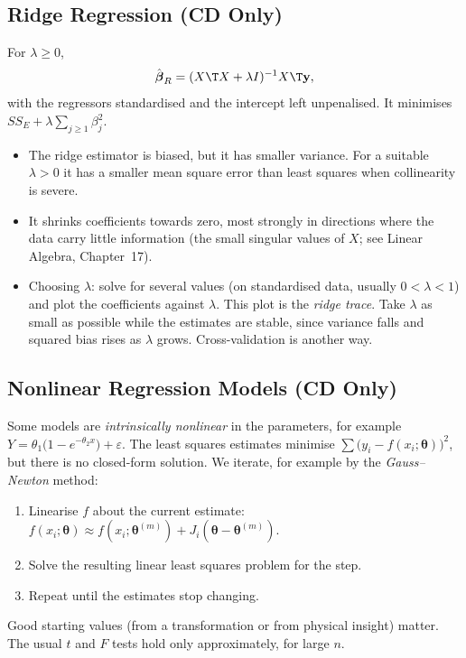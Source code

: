 \subsection{Ridge Regression (CD Only)}

\begin{definition}
For $\lambda\ge0$,
\[ \hat{\boldsymbol\beta}_R=(X\T X+\lambda I)^{-1}X\T\mathbf{y}, \]
with the regressors standardised and the intercept left unpenalised. It minimises $SS_E+\lambda\sum_{j\ge1}\beta_j^2$.
\end{definition}

\begin{itemize}
  \item The ridge estimator is biased, but it has smaller variance. For a suitable $\lambda>0$ it has a smaller mean square error than least squares when collinearity is severe.
  \item It shrinks coefficients towards zero, most strongly in directions where the data carry little information (the small singular values of $X$; see Linear Algebra, Chapter~17).
  \item Choosing $\lambda$: solve for several values (on standardised data, usually $0<\lambda<1$) and plot the coefficients against $\lambda$. This plot is the \emph{ridge trace}. Take $\lambda$ as small as possible while the estimates are stable, since variance falls and squared bias rises as $\lambda$ grows. Cross-validation is another way.
\end{itemize}

\subsection{Nonlinear Regression Models (CD Only)}

Some models are \emph{intrinsically nonlinear} in the parameters, for example $Y=\theta_1\big(1-e^{-\theta_2x}\big)+\varepsilon$. The least squares estimates minimise $\sum\big(y_i-f(x_i;\boldsymbol\theta)\big)^2$, but there is no closed-form solution. We iterate, for example by the \emph{Gauss--Newton} method:
\begin{enumerate}
  \item Linearise $f$ about the current estimate: $f(x_i;\boldsymbol\theta)\approx f(x_i;\boldsymbol\theta^{(m)})+J_i(\boldsymbol\theta-\boldsymbol\theta^{(m)})$.
  \item Solve the resulting linear least squares problem for the step.
  \item Repeat until the estimates stop changing.
\end{enumerate}
Good starting values (from a transformation or from physical insight) matter. The usual $t$ and $F$ tests hold only approximately, for large $n$.

